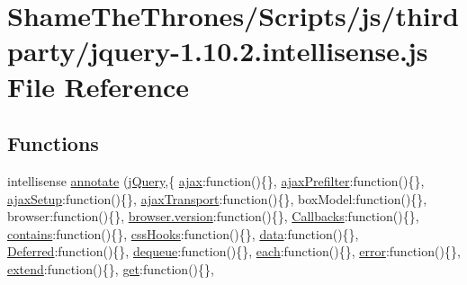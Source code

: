 \hypertarget{jquery-1_810_82_8intellisense_8js}{}\section{Shame\+The\+Thrones/\+Scripts/js/thirdparty/jquery-\/1.10.2.intellisense.\+js File Reference}
\label{jquery-1_810_82_8intellisense_8js}
\subsection*{Functions}
\begin{DoxyCompactItemize}
\item 
intellisense \hyperlink{jquery-1_810_82_8intellisense_8js_ad1527630d45bb696c9bc5e21e4bd7355}{annotate} (\hyperlink{jquery_8rateyo_8min_8js_a2b1d6f9c448e3ce72f4e1865d6e38d2c}{j\+Query},\{ \textquotesingle{}\hyperlink{jquery-2_82_81-vsdoc_8js_a3c9e2ac71a76356869090140308936dc}{ajax}\textquotesingle{}\+:function()\{\}, \textquotesingle{}\hyperlink{jquery-2_82_81-vsdoc_8js_a414ccda111294ca405827d1f416a7512}{ajax\+Prefilter}\textquotesingle{}\+:function()\{\}, \textquotesingle{}\hyperlink{jquery-2_82_81-vsdoc_8js_a3b12f4f2a83dfdae4e81bcaeaf2a2f42}{ajax\+Setup}\textquotesingle{}\+:function()\{\}, \textquotesingle{}\hyperlink{jquery-2_82_81-vsdoc_8js_afe3900e3907689b52735b9c2bf0b8ff6}{ajax\+Transport}\textquotesingle{}\+:function()\{\}, \textquotesingle{}box\+Model\textquotesingle{}\+:function()\{\}, \textquotesingle{}browser\textquotesingle{}\+:function()\{\}, \textquotesingle{}\hyperlink{_shame_the_thrones_2_scripts_2js_2thirdparty_2bootstrap_8min_8js_af15ce22371f8af3b38c7d40a4987b366}{browser.\+version}\textquotesingle{}\+:function()\{\}, \textquotesingle{}\hyperlink{jquery-2_82_80_8intellisense_8js_add8d59d25831bb9b171fdbee8a18795b}{Callbacks}\textquotesingle{}\+:function()\{\}, \textquotesingle{}\hyperlink{tsc_8js_a7665f31886bcd4ed39aa87c79ed64340}{contains}\textquotesingle{}\+:function()\{\}, \textquotesingle{}\hyperlink{jquery-2_82_81-vsdoc_8js_a9966a63bdc4e33753dbe36a83e7f96bf}{css\+Hooks}\textquotesingle{}\+:function()\{\}, \textquotesingle{}\hyperlink{jquery-2_82_81-vsdoc_8js_a609407b3456fdc3c5671a9fc4a226ff7}{data}\textquotesingle{}\+:function()\{\}, \textquotesingle{}\hyperlink{jquery-2_82_80_8intellisense_8js_ab355ffd82371d88c17da7c1dae9e8829}{Deferred}\textquotesingle{}\+:function()\{\}, \textquotesingle{}\hyperlink{jquery-2_82_81-vsdoc_8js_a721f718178dce35dc9a4bf9fe8b6de23}{dequeue}\textquotesingle{}\+:function()\{\}, \textquotesingle{}\hyperlink{jquery-2_82_80_8min_8js_a53c7b9ea828db458b7ad4c5bd7d20b58}{each}\textquotesingle{}\+:function()\{\}, \textquotesingle{}\hyperlink{jquery-2_82_81-vsdoc_8js_acd25716dc66c2c57df2fc97807ffbddf}{error}\textquotesingle{}\+:function()\{\}, \textquotesingle{}\hyperlink{jquery-2_82_80_8min_8js_a798d2452a6cada224fa212d35d4e0325}{extend}\textquotesingle{}\+:function()\{\}, \textquotesingle{}\hyperlink{jquery-2_82_81-vsdoc_8js_a904e08d31e9d836b29247ea5e274ae83}{get}\textquotesingle{}\+:function()\{\}, 
\end{DoxyCompactItemize}
